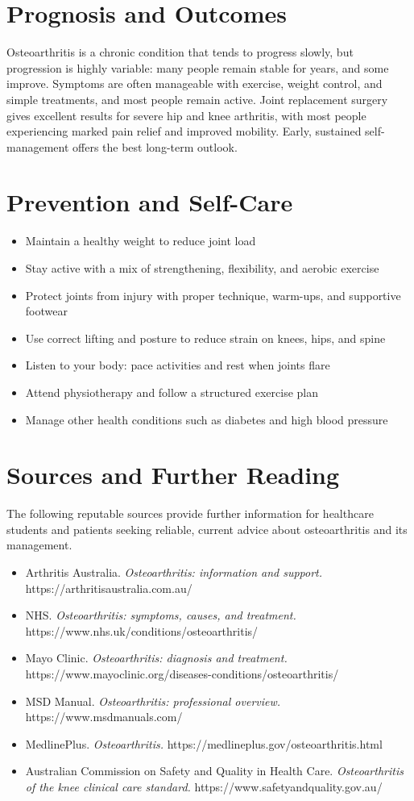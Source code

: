 \section*{Prognosis and Outcomes}
Osteoarthritis is a chronic condition that tends to progress slowly, but progression is highly variable: many people remain stable for years, and some improve. Symptoms are often manageable with exercise, weight control, and simple treatments, and most people remain active. Joint replacement surgery gives excellent results for severe hip and knee arthritis, with most people experiencing marked pain relief and improved mobility. Early, sustained self-management offers the best long-term outlook.

\section*{Prevention and Self-Care}
\begin{itemize}
    \item Maintain a healthy weight to reduce joint load
    \item Stay active with a mix of strengthening, flexibility, and aerobic exercise
    \item Protect joints from injury with proper technique, warm-ups, and supportive footwear
    \item Use correct lifting and posture to reduce strain on knees, hips, and spine
    \item Listen to your body: pace activities and rest when joints flare
    \item Attend physiotherapy and follow a structured exercise plan
    \item Manage other health conditions such as diabetes and high blood pressure
\end{itemize}

\section*{Sources and Further Reading}
The following reputable sources provide further information for healthcare students and patients seeking reliable, current advice about osteoarthritis and its management.

\begin{itemize}
    \item Arthritis Australia. \textit{Osteoarthritis: information and support.} https://arthritisaustralia.com.au/
    \item NHS. \textit{Osteoarthritis: symptoms, causes, and treatment.} https://www.nhs.uk/conditions/osteoarthritis/
    \item Mayo Clinic. \textit{Osteoarthritis: diagnosis and treatment.} https://www.mayoclinic.org/diseases-conditions/osteoarthritis/
    \item MSD Manual. \textit{Osteoarthritis: professional overview.} https://www.msdmanuals.com/
    \item MedlinePlus. \textit{Osteoarthritis.} https://medlineplus.gov/osteoarthritis.html
    \item Australian Commission on Safety and Quality in Health Care. \textit{Osteoarthritis of the knee clinical care standard.} https://www.safetyandquality.gov.au/
\end{itemize}
